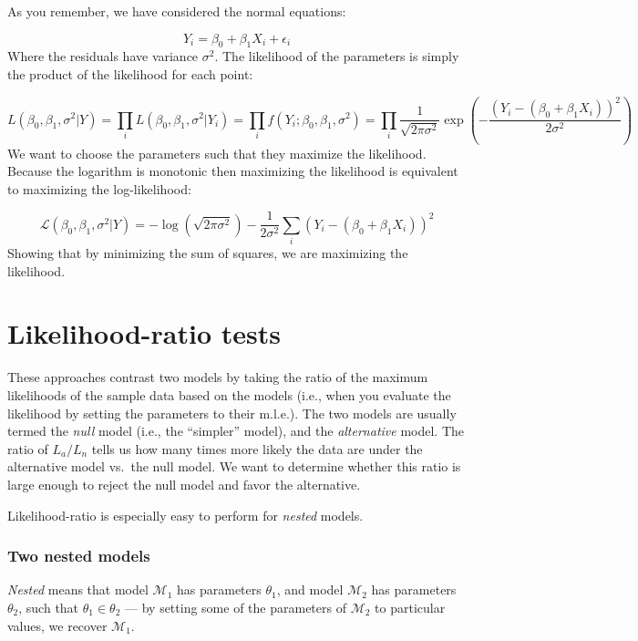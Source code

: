 \documentclass[
  letterpaper,
  DIV=11,
  numbers=noendperiod]{scrreprt}
\begin{document}
As you remember, we have considered the normal equations:

\[
Y_i = \beta_0 + \beta_1 X_i + \epsilon_i
\] Where the residuals have variance \(\sigma^2\). The likelihood of the
parameters is simply the product of the likelihood for each point:

\[
L(\beta_0, \beta_1, \sigma^2 \vert Y) = \prod_i L(\beta_0, \beta_1, \sigma^2 \vert Y_i) = \prod_i f(Y_i; \beta_0, \beta_1, \sigma^2) = 
\prod_i \frac{1}{\sqrt{2 \pi \sigma^2}} \exp\left(-\frac{(Y_i - (\beta_0 + \beta_1 X_i))^2}{2 \sigma^2}\right)
\] We want to choose the parameters such that they maximize the
likelihood. Because the logarithm is monotonic then maximizing the
likelihood is equivalent to maximizing the log-likelihood:

\[
\mathcal L(\beta_0, \beta_1, \sigma^2 \vert Y) = -\log\left(\sqrt{2 \pi \sigma^2}\right) -\frac{1}{{2 \sigma^2}} \sum_i {(Y_i - (\beta_0 + \beta_1 X_i))^2}
\] Showing that by minimizing the sum of squares, we are maximizing the
likelihood.

\section{Likelihood-ratio tests}\label{likelihood-ratio-tests}

These approaches contrast two models by taking the ratio of the maximum
likelihoods of the sample data based on the models (i.e., when you
evaluate the likelihood by setting the parameters to their m.l.e.). The
two models are usually termed the \emph{null} model (i.e., the
``simpler'' model), and the \emph{alternative} model. The ratio of
\(L_a / L_n\) tells us how many times more likely the data are under the
alternative model vs.~the null model. We want to determine whether this
ratio is large enough to reject the null model and favor the
alternative.

Likelihood-ratio is especially easy to perform for \emph{nested} models.

\subsubsection{Two nested models}\label{two-nested-models}

\emph{Nested} means that model \(\mathcal M_1\) has parameters
\(\theta_1\), and model \(\mathcal M_2\) has parameters \(\theta_2\),
such that \(\theta_1 \in \theta_2\) --- by setting some of the
parameters of \(\mathcal M_2\) to particular values, we recover
\(\mathcal M_1\).
\end{document}
